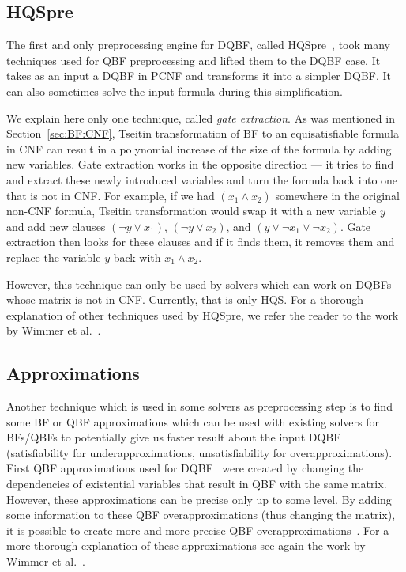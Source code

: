 \documentclass[
  digital, %
  color,
  twoside, %
  table,   %
  nolof,     %
  nolot,     %
]{fithesis3}
\theoremstyle{definition}
\theoremstyle{remark}
\begin{document}
\subsection{HQSpre}
\label{sec:HQSpre}
The first and only preprocessing engine for DQBF, called HQSpre~\cite{HQSpre1,HQSpre2,HQSpreJournal}, took many techniques used for QBF preprocessing and lifted them to the DQBF case. It takes as an input a DQBF in PCNF and transforms it into a simpler DQBF. It can also sometimes solve the input formula during this simplification. 

We explain here only one technique, called \emph{gate extraction}. As was mentioned in Section~\ref{sec:BF:CNF}, Tseitin transformation of BF to an equisatisfiable formula in CNF can result in a polynomial increase of the size of the formula by adding new variables. Gate extraction works in the opposite direction --- it tries to find and extract these newly introduced variables and turn the formula back into one that is not in CNF. %
For example, if we had $(x_1 \land x_2)$ somewhere in the original non-CNF formula, Tseitin transformation would swap it with a new variable $y$ and add new clauses $(\neg y \lor x_1)$, $(\neg y \lor x_2)$, and $(y \lor \neg x_1 \lor \neg x_2)$. Gate extraction then looks for these clauses and if it finds them, it removes them and replace the variable $y$ back with $x_1 \land x_2$.

However, this technique can only be used by solvers which can work on DQBFs whose matrix is not in CNF. Currently, that is only HQS. For a thorough explanation of other techniques used by HQSpre, we refer the reader to the work by Wimmer et al.~\cite{HQSpreJournal}. 

\subsection{Approximations}
\label{sec:prepro:approximations}
Another technique which is used in some solvers as preprocessing step is to find some BF or QBF approximations which can be used with existing solvers for BFs/QBFs to potentially give us faster result about the input DQBF (satisfiability for underapproximations, unsatisfiability for overapproximations). First QBF approximations used for DQBF~\cite{HQSsimpleAlg} were created by changing the dependencies of existential variables that result in QBF with the same matrix. However, these approximations can be precise only up to some level. By adding some information to these QBF overapproximations (thus changing the matrix), it is possible to create more and more precise QBF overapproximations~\cite{FastDQBFRefutation}. For a more thorough explanation of these approximations see again the work by Wimmer et al.~\cite[Section~3]{HQSpreJournal}.
\end{document}
